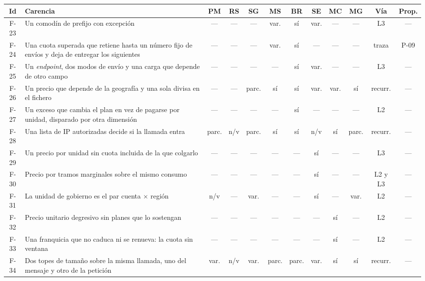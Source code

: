\begin{table}[H]
\centering
\footnotesize
\setlength{\tabcolsep}{2.5pt}
\begin{tabular}{|c|p{4.6cm}|c|c|c|c|c|c|c|c|c|c|}
\hline
\textbf{Id} & \textbf{Carencia} & \textbf{PM} & \textbf{RS} & \textbf{SG} & \textbf{MS} & \textbf{BR} & \textbf{SE} & \textbf{MC} & \textbf{MG} & \textbf{Vía} & \textbf{Prop.} \\
\hline
F-23 & Un comodín de prefijo con excepción & --- & --- & --- & var. & sí & var. & --- & --- & L3 & --- \\
\hline
F-24 & Una cuota superada que retiene hasta un número fijo de envíos y deja de entregar los siguientes & --- & --- & --- & var. & sí & --- & --- & --- & traza & P-09 \\
\hline
F-25 & Un \textit{endpoint}, dos modos de envío y una carga que depende de otro campo & --- & --- & --- & --- & sí & var. & --- & --- & L3 & --- \\
\hline
F-26 & Un precio que depende de la geografía y una sola divisa en el fichero & --- & --- & parc. & sí & sí & var. & var. & sí & recurr. & --- \\
\hline
F-27 & Un exceso que cambia el plan en vez de pagarse por unidad, disparado por otra dimensión & --- & --- & --- & --- & sí & --- & --- & --- & L2 & --- \\
\hline
F-28 & Una lista de IP autorizadas decide si la llamada entra & parc. & n/v & parc. & sí & sí & n/v & sí & parc. & recurr. & --- \\
\hline
F-29 & Un precio por unidad sin cuota incluida de la que colgarlo & --- & --- & --- & --- & --- & sí & --- & --- & L3 & --- \\
\hline
F-30 & Precio por tramos marginales sobre el mismo consumo & --- & --- & --- & --- & --- & sí & --- & --- & L2 y L3 & --- \\
\hline
F-31 & La unidad de gobierno es el par cuenta $\times$ región & n/v & --- & var. & --- & --- & sí & --- & var. & L2 & --- \\
\hline
F-32 & Precio unitario degresivo sin planes que lo sostengan & --- & --- & --- & --- & --- & --- & sí & --- & L2 & --- \\
\hline
F-33 & Una franquicia que no caduca ni se renueva: la cuota sin ventana & --- & --- & --- & --- & --- & --- & sí & --- & L2 & --- \\
\hline
F-34 & Dos topes de tamaño sobre la misma llamada, uno del mensaje y otro de la petición & var. & n/v & var. & parc. & parc. & var. & sí & sí & recurr. & --- \\

\end{tabular}
\end{table}
